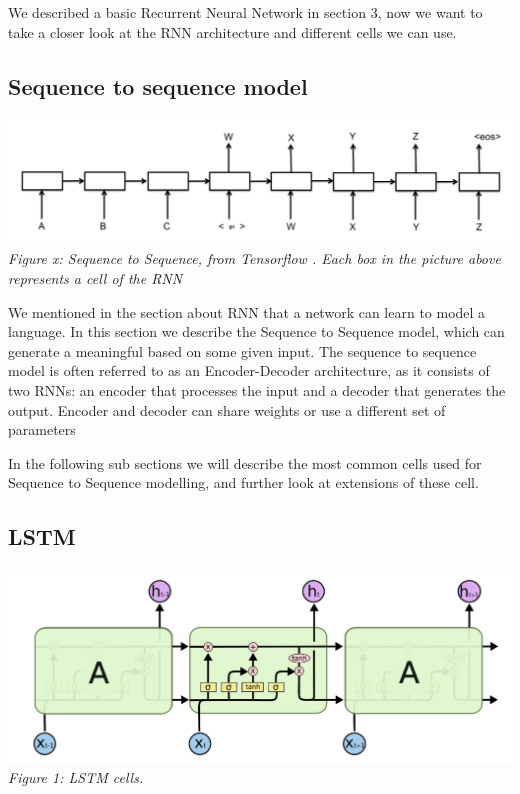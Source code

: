 \documentclass{article} %
\begin{document}
We described a basic Recurrent Neural Network in section 3, now we want to take a closer look at the RNN architecture and different cells we can use. 

\subsection{Sequence to sequence model}
\includegraphics[scale=0.5]{seq2seq} \newline
\textit{Figure x: Sequence to Sequence, from Tensorflow \cite{seq2seq}. Each box in the picture above represents a cell of the RNN } \newline

We mentioned in the section about RNN that a network can learn to model a language. In this section we describe the Sequence to Sequence model, which can generate a meaningful based on some given input. The sequence to sequence model is often referred to as an Encoder-Decoder architecture, as it consists of two RNNs: an encoder that processes the input and a decoder that generates the output. Encoder and decoder can share weights or use a different set of parameters

In the following sub sections we will describe the most common cells used for Sequence to Sequence modelling, and further look at extensions of these cell. 

\subsection{LSTM}
\includegraphics[scale=0.5]{lstm_cells} \newline
\textit{Figure 1: LSTM cells.  } \newline
\end{document}
